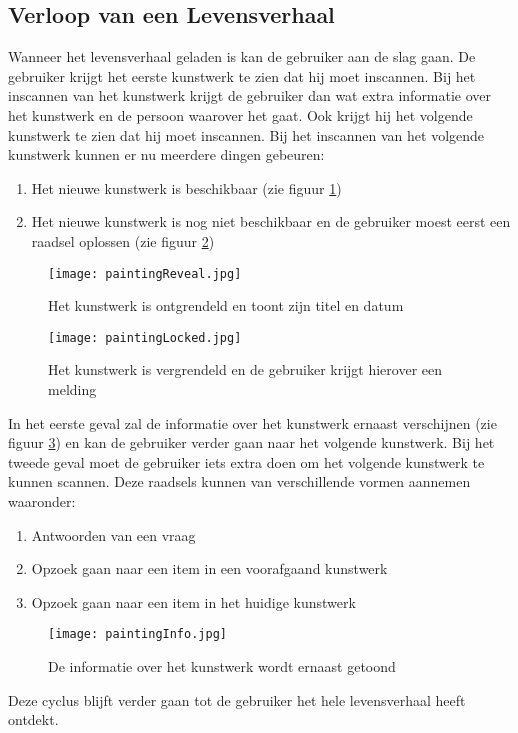 \subsection{Verloop van een Levensverhaal}
Wanneer het levensverhaal geladen is kan de gebruiker aan de slag gaan. De gebruiker krijgt het eerste kunstwerk te zien dat hij moet inscannen. Bij het inscannen van het kunstwerk krijgt de gebruiker dan wat extra informatie over het kunstwerk en de persoon waarover het gaat. Ook krijgt hij het volgende kunstwerk te zien dat hij moet inscannen. Bij het inscannen van het volgende kunstwerk kunnen er nu meerdere dingen gebeuren:

\begin{enumerate}
    \item Het nieuwe kunstwerk is beschikbaar (zie figuur \ref{fig:paintingReveal})
    \item Het nieuwe kunstwerk is nog niet beschikbaar en de gebruiker moest eerst een raadsel oplossen (zie figuur \ref{fig:paintingLocked})
\end{enumerate}
\begin{figure}
    \centering
    \texttt{[image: paintingReveal.jpg]}
    \caption{Het kunstwerk is ontgrendeld en toont zijn titel en datum}
    \label{fig:paintingReveal}
\end{figure}
\begin{figure}
      \centering
    \texttt{[image: paintingLocked.jpg]}
    \caption{Het kunstwerk is vergrendeld en de gebruiker krijgt hierover een melding}
    \label{fig:paintingLocked}
\end{figure}


In het eerste geval zal de informatie over het kunstwerk ernaast verschijnen (zie figuur \ref{fig:paintingInfo}) en kan de gebruiker verder gaan naar het volgende kunstwerk. Bij het tweede geval moet de gebruiker iets extra doen om het volgende kunstwerk te kunnen scannen. Deze raadsels kunnen van verschillende vormen aannemen waaronder:

\begin{enumerate}
    \item Antwoorden van een vraag
    \item Opzoek gaan naar een item in een voorafgaand kunstwerk
    \item Opzoek gaan naar een item in het huidige kunstwerk
\end{enumerate}
\begin{figure}
    \centering
    \texttt{[image: paintingInfo.jpg]}
    \caption{De informatie over het kunstwerk wordt ernaast getoond}
    \label{fig:paintingInfo}
\end{figure}
Deze cyclus blijft verder gaan tot de gebruiker het hele levensverhaal heeft ontdekt.

